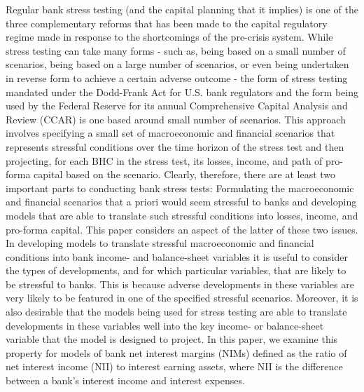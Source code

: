 \documentclass[12pt]{article}
\begin{document}
Regular bank stress testing (and the capital planning that it implies) is one of the three complementary reforms that has been made to the capital regulatory regime made in response to the shortcomings of the pre-crisis system.   While stress testing can take many forms - such as, being based on a small number of scenarios, being based on a large number of scenarios, or even being undertaken in reverse form to achieve a certain adverse outcome - the form of stress testing mandated under the Dodd-Frank Act for U.S. bank regulators and the form being used by the Federal Reserve for its annual Comprehensive Capital Analysis and Review (CCAR) is one based around small number of scenarios.  This approach involves specifying a small set of macroeconomic and financial scenarios that represents stressful conditions over the time horizon of the stress test and then projecting, for each BHC in the stress test, its losses, income, and path of pro-forma capital based on the scenario.  Clearly, therefore, there are at least two important parts to conducting bank stress tests:  Formulating the macroeconomic and financial scenarios that a priori would seem stressful to banks and developing models that are able to translate such stressful conditions into losses, income, and pro-forma capital.  This paper considers an aspect of the latter of these two issues.
	In developing models to translate stressful macroeconomic and financial conditions into bank income- and balance-sheet variables it is useful to consider the types of developments, and for which particular variables, that are likely to be stressful to banks.  This is because adverse developments in these variables are very likely to be featured in one of the specified stressful scenarios.  Moreover, it is also desirable that the models being used for stress testing are able to translate developments in these variables well into the key income- or balance-sheet variable that the model is designed to project.  In this paper, we examine this property for models of bank net interest margins (NIMs) defined as the ratio of net interest income (NII) to interest earning assets, where NII is the difference between a bank's interest income and interest expenses.
\end{document}
